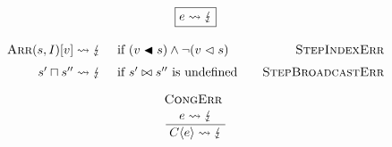 \renewcommand\arraystretch{1.5}
\begin{gather*}
\boxed{e \sterr} \\[0.5em]
\begin{array}{rlr}
\sarrayval{\vess}{I}[v] 
\leadsto \lightning 
&\text{ if } (v \inbstr \vess) \land \lnot (v \inbs \vess) 
& \textsc{StepIndexErr} \\
\vess' \broadcast \vess'' 
\leadsto \lightning 
&\text{ if } \vess' \broadcastsem \vess'' \text{ is undefined} 
&\quad \textsc{StepBroadcastErr}
\end{array}
\\
\irule{CongErr}{e \leadsto \lightning}{\ctx{\evalct}{e} \leadsto \lightning}
\end{gather*}
